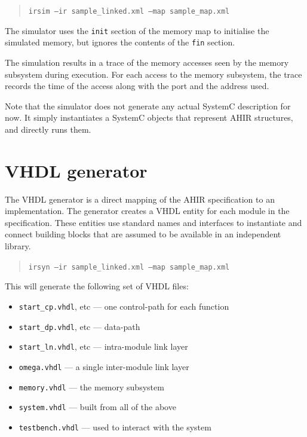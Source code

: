 \documentclass[12pt]{article}
\begin{document}
\begin{quote}
\tt  irsim --ir sample\_linked.xml --map sample\_map.xml
\end{quote}

The simulator uses the \texttt{init} section of the memory map to
initialise the simulated memory, but ignores the contents of the
\texttt{fin} section.

The simulation results in a trace of the memory accesses seen by the
memory subsystem during execution. For each access to the memory
subsystem, the trace records the time of the access along with the
port and the address used.

Note that the simulator does not generate any actual SystemC
description for now. It simply instantiates a SystemC objects that
represent AHIR structures, and directly runs them.




\section{VHDL generator}

The VHDL generator is a direct mapping of the AHIR specification to an
implementation. The generator creates a VHDL entity for each module in
the specification. These entities use standard names and interfaces to
instantiate and connect building blocks that are assumed to be
available in an independent library.

\begin{quote}
\tt irsyn --ir sample\_linked.xml --map sample\_map.xml
\end{quote}

This will generate the following set of VHDL files:

\begin{itemize}
  \item \texttt{start\_cp.vhdl}, etc --- one control-path for each function
  \item \texttt{start\_dp.vhdl}, etc --- data-path
  \item \texttt{start\_ln.vhdl}, etc --- intra-module link layer
  \item \texttt{omega.vhdl} --- a single inter-module link layer
  \item \texttt{memory.vhdl} --- the memory subsystem
  \item \texttt{system.vhdl} --- built from all of the above
  \item \texttt{testbench.vhdl} --- used to interact with the system
\end{itemize}
\end{document}
